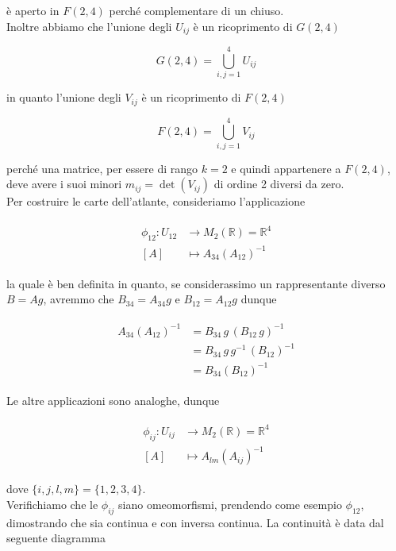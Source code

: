 è aperto in $ F(2,4) $ perché complementare di un chiuso.\\
Inoltre abbiamo che l'unione degli $ U_{ij} $ è un ricoprimento di $ G(2,4) $

\begin{equation}
	G(2,4) = \bigcup_{i,j=1}^{4} U_{ij}
\end{equation}

in quanto l'unione degli $ V_{ij} $ è un ricoprimento di $ F(2,4) $

\begin{equation}
	F(2,4) = \bigcup_{i,j=1}^{4} V_{ij}
\end{equation}

perché una matrice, per essere di rango $ k=2 $ e quindi appartenere a $ F(2,4) $, deve avere i suoi minori $ m_{ij} = \det(V_{ij}) $ di ordine 2 diversi da zero.\\
Per costruire le carte dell'atlante, consideriamo l'applicazione

\begin{align}
	\begin{split}
		\phi_{12} : U_{12} &\to M_{2}(\mathbb{R}) = \mathbb{R}^{4}\\
		[A] &\mapsto A_{34} (A_{12})^{-1}
	\end{split}
\end{align}

la quale è ben definita in quanto, se considerassimo un rappresentante diverso $ B = A g $, avremmo che $ B_{34} = A_{34} g $ e $ B_{12} = A_{12} g $ dunque

\begin{align}
	\begin{split}
		A_{34} (A_{12})^{-1} &= B_{34} \, g \, (B_{12} \, g)^{-1}\\
		&= B_{34} \, g \, g^{-1} \, (B_{12})^{-1}\\
		&= B_{34} (B_{12})^{-1}
	\end{split}
\end{align}

Le altre applicazioni sono analoghe, dunque

\begin{align}
	\begin{split}
		\phi_{ij} : U_{ij} &\to M_{2}(\mathbb{R}) = \mathbb{R}^{4}\\
		[A] &\mapsto A_{lm} (A_{ij})^{-1}
	\end{split}
\end{align}

dove $ \{i,j,l,m\}=\{1,2,3,4\} $.\\
Verifichiamo che le $ \phi_{ij} $ siano omeomorfismi, prendendo come esempio $ \phi_{12} $, dimostrando che sia continua e con inversa continua. La continuità è data dal seguente diagramma

